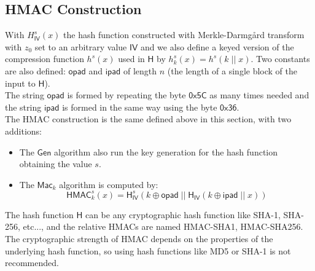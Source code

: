 \subsection{HMAC Construction}
With $H^s_{\mathsf{IV}}(x)$ the hash function constructed with Merkle-Darmg\r{a}rd transform with $z_0$ set to an arbitrary value $\mathsf{IV}$ and we also define a keyed version of the compression function $h^s(x)$ used in $\mathsf{H}$ by $h^s_k(x) = h^s(k\;||\;x)$. Two constants are also defined: $\mathsf{opad}$ and $\mathsf{ipad}$ of length $n$ (the length of a single block of the input to $\mathsf{H}$).\\
The string $\mathsf{opad}$ is formed by repeating the byte $\mathsf{0x5C}$ as many times needed and the string $\mathsf{ipad}$ is formed in the same way using the byte $\mathsf{0x36}$.\\
The HMAC construction is the same defined above in this section, with two additions:
\begin{itemize}
    \item{The $\mathsf{Gen}$ algorithm also run the key generation for the hash function obtaining the value $s$.}
    \item{The $\mathsf{Mac}_k$ algorithm is computed by:
$$
    \mathsf{HMAC}^s_k(x) = \mathsf{H}^s_\mathsf{IV}(k \oplus \mathsf{opad}\;||\;\mathsf{H}_\mathsf{IV}(k \oplus \mathsf{ipad}\;||\;x))
$$
        }
\end{itemize}
The hash function $\mathsf{H}$ can be any cryptographic hash function like SHA-1, SHA-256, etc..., and the relative HMACs are named HMAC-SHA1, HMAC-SHA256. The cryptographic strength of HMAC depends on the properties of the underlying hash function, so using hash functions like MD5 or SHA-1 is not recommended.
